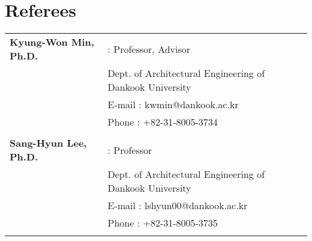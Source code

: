 \documentclass[]{article}
\begin{document}
\section*{Referees}
\begin{tabularx}{\textwidth}{XX}
    \textbf{Kyung-Won Min, Ph.D.} & : Professor, Advisor \\
    & Dept. of Architectural Engineering of Dankook University \\
    & E-mail : kwmin@dankook.ac.kr \\
    & Phone : +82-31-8005-3734 \\
    \\
    \textbf{Sang-Hyun Lee, Ph.D.} & : Professor \\
    & Dept. of Architectural Engineering of Dankook University \\
    & E-mail : lshyun00@dankook.ac.kr \\
    & Phone : +82-31-8005-3735 \\
    \\
\end{tabularx}
%
\end{document}
